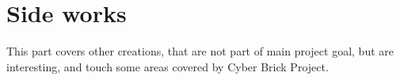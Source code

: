 \section{Side works}

This part covers other creations, that are not part of main project goal, but are interesting,
and touch some areas covered by Cyber Brick Project.

